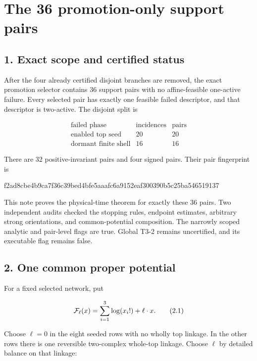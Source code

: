 \section{The 36 promotion-only support
pairs}

\subsection{1. Exact scope and certified
status}

After the four already certified disjoint branches are removed, the
exact promotion selector contains 36 support pairs with no
affine-feasible one-active failure. Every selected pair has exactly one
feasible failed descriptor, and that descriptor is two-active. The
disjoint split is

\[
\begin{array}{c|r|r}
\text{failed phase}&\text{incidences}&\text{pairs}\\ \hline
\text{enabled top seed}&20&20\\
\text{dormant finite shell}&16&16
\end{array}                                             \tag{1.1}
\]

There are 32 positive-invariant pairs and four signed pairs. Their pair
fingerprint is

\begin{CodeBlock}
f2ad8cbe4b9ca7f36c39bed4bfe5aaafc6a9152eaf300390b5c25ba546519137
\end{CodeBlock}

This note proves the physical-time theorem for exactly these 36 pairs.
Two independent audits checked the stopping rules, endpoint estimates,
arbitrary strong orientations, and common-potential composition. The
narrowly scoped analytic and pair-level flags are true. Global T3-2
remains uncertified, and its executable flag remains false.

\subsection{2. One common proper
potential}

For a fixed selected network, put

\[
 {\cal F}_\ell(x)=\sum_{i=1}^3\log(x_i!)+\ell\cdot x.   \tag{2.1}
\]

Choose \(\ell=0\) in the eight seeded rows with no wholly top linkage.
In the other rows there is one reversible two-complex whole-top linkage.
Choose \(\ell\) by detailed balance on that linkage:

